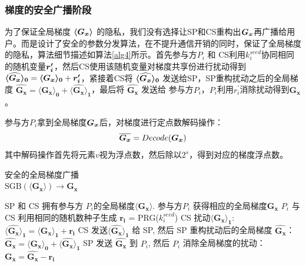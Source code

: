\subsubsection{梯度的安全广播阶段}\label{distribution} 
为了保证全局梯度 $\svec{G_x}$ 的隐私，我们没有选择让SP和CS重构出$\bs{G_x}$再广播给用户。而是设计了安全的参数分发算法，在不提升通信开销的同时，保证了全局梯度的隐私，算法细节描述如算法\ref{alg4}所示。首先参与方$P_i$ 和 CS利用$k_i^{seed}$协同相同的随机变量$\bs{r_i^{\prime}}$，然后CS使用该随机变量对梯度共享份进行扰动得到 $\svec[0]{\widehat{G_x}} = \svec[0]{G_x} + \bs{r_i^{\prime}}$，紧接着CS将 $\svec[0]{\widehat{G_x}}$ 发送给SP，SP重构扰动之后的全局梯度 $\boldsymbol{\widehat{G_x}} = \boldsymbol{\langle G_x\rangle_0} + \boldsymbol{\langle \widehat{G_x}\rangle_1}$，最后将 $\boldsymbol{\widehat{G_x}}$ 发送给 参与方$P_i$，$P_i$利用$r_i^{\prime}$消除扰动得到$\boldsymbol{G_x}$。

参与方$P_i$拿到全局梯度$\bs{G_x}$后，对梯度进行定点数解码操作：
\begin{equation}
	\bs{\overline{G_x}} = Decode(\bs{G_x})
\end{equation}
其中解码操作首先将元素$v$视为浮点数，然后除以$2^s$，得到对应的梯度浮点数。

\begin{algorithm}[htbp]
	\caption{安全的全局梯度广播 \\$\text{SGB}(\boldsymbol{\langle G_x\rangle}) \rightarrow \boldsymbol{G_x}$}
	\label{alg4}
	\begin{algorithmic}[1]
		\REQUIRE SP 和 CS 拥有参与方 $P_i$的全局梯度$\boldsymbol{\langle G_x\rangle}$.
		\ENSURE 参与方$P_i$ 获得相应的全局梯度$\boldsymbol{G_x}$
		\STATE $P_i$ 与 CS 利用相同的随机数种子生成 $\boldsymbol{r_i}$ = PRG($k_i^{seed}$) 
		\STATE CS 扰动$\boldsymbol{\langle G_x\rangle_1}$:\\ $\boldsymbol{\langle \widehat{G_x}\rangle_1} = \boldsymbol{\langle G_x\rangle_1} + \boldsymbol{r_i}$
		\STATE CS 发送$\boldsymbol{\langle \widehat{G_x}\rangle_1}$ 给 SP, 然后 SP 重构扰动后的全局梯度 $\boldsymbol{\widehat{G_x}}$：\\ $\boldsymbol{\widehat{G_x}} = \boldsymbol{\langle G_x\rangle_0} + \boldsymbol{\langle \widehat{G_x}\rangle_1}$
		\STATE SP 发送 $\boldsymbol{\widehat{G_x}}$ 到 $P_i$, 然后 $P_i$ 消除全局梯度的扰动：\\$\boldsymbol{G_x} = \boldsymbol{\widehat{G_x}} - \boldsymbol{r_i}$
	\end{algorithmic}
\end{algorithm}

